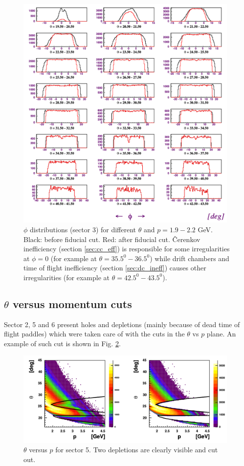 \begin{figure}[ht]
    \centering
    \includegraphics[width=0.98\textwidth ]{img/electron_phis}
    \caption{$\phi$ distributions (sector 3) for different $\theta$ and
        $p=1.9-2.2$ GeV. Black: before fiducial cut. Red: after fiducial cut.
        \v Cerenkov inefficiency (section \ref{sec:cc_eff}) is responsible
        for some irregularities at $\phi = 0$ (for example at
        $\theta = 35.5^0 - 36.5^0$) while drift chambers and time of flight
        inefficiency (section \ref{sec:dc_ineff}) causes other irregularities
        (for example at  $\theta = 42.5^0 - 43.5^0$).}
    \label{fig:fidu_ephis}
\end{figure}


\clearpage\newpage




\subsection{ $\theta$ versus momentum cuts}
Sector 2, 5 and 6 present holes and depletions (mainly because of dead time of flight paddles)
which were taken care of with the
cuts in the $\theta$ vs $p$ plane. An example of such cut is shown in Fig. \ref{fig:fidu_etp5}.

\begin{figure}[h]
 \begin{center}
 \includegraphics[width=0.98\textwidth ]{img/electron_tp5}
  \caption[ $\theta$ versus $p$ for sector 5]
          { $\theta$ versus $p$ for sector 5. Two depletions are clearly visible and cut out.}
 \label{fig:fidu_etp5}
 \end{center}
\end{figure}


